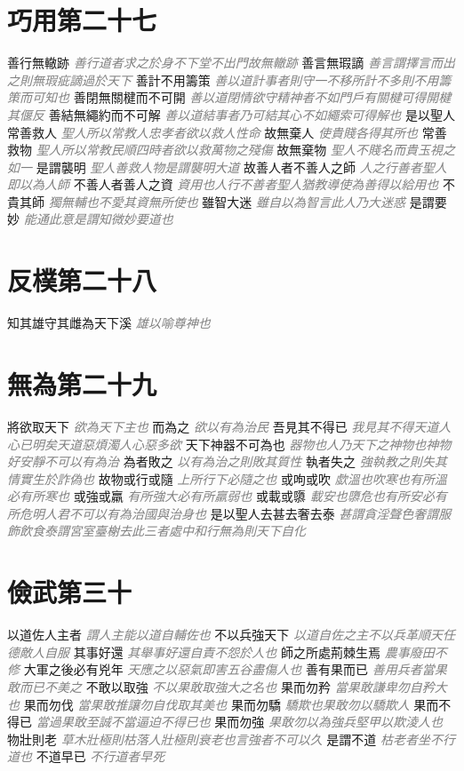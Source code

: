 \documentclass[a4paper,zihao=-4,oneside,landscape,UTF8]{ctexart}
\newcommand{\zhushi}[1]{\scriptsize{\textit{\textcolor{gray}{#1}}}\normalsize}
\begin{document}
\section{巧用第二十七}

善行無轍跡
\zhushi{善行道者求之於身不下堂不出門故無轍跡}
善言無瑕謫
\zhushi{善言謂擇言而出之則無瑕疵謫過於天下}
善計不用籌策
\zhushi{善以道計事者則守一不移所計不多則不用籌策而可知也}
善閉無關楗而不可開
\zhushi{善以道閉情欲守精神者不如門戶有關楗可得開楗其偃反}
善結無繩約而不可解
\zhushi{善以道結事者乃可結其心不如繩索可得解也}
是以聖人常善救人
\zhushi{聖人所以常教人忠孝者欲以救人性命}
故無棄人
\zhushi{使貴賤各得其所也}
常善救物
\zhushi{聖人所以常教民順四時者欲以救萬物之殘傷}
故無棄物
\zhushi{聖人不賤名而貴玉視之如一}
是謂襲明
\zhushi{聖人善救人物是謂襲明大道}
故善人者不善人之師
\zhushi{人之行善者聖人即以為人師}
不善人者善人之資
\zhushi{資用也人行不善者聖人猶教導使為善得以給用也}
不貴其師
\zhushi{獨無輔也不愛其資無所使也}
雖智大迷
\zhushi{雖自以為智言此人乃大迷惑}
是謂要妙
\zhushi{能通此意是謂知微妙要道也}


\section{反樸第二十八}

知其雄守其雌為天下溪
\zhushi{雄以喻尊神也}


\section{無為第二十九}

將欲取天下
\zhushi{欲為天下主也}
而為之
\zhushi{欲以有為治民}
吾見其不得已
\zhushi{我見其不得天道人心已明矣天道惡煩濁人心惡多欲}
天下神器不可為也
\zhushi{器物也人乃天下之神物也神物好安靜不可以有為治}
為者敗之
\zhushi{以有為治之則敗其質性}
執者失之
\zhushi{強執教之則失其情實生於詐偽也}
故物或行或隨
\zhushi{上所行下必隨之也}
或呴或吹
\zhushi{歔溫也吹寒也有所溫必有所寒也}
或強或羸
\zhushi{有所強大必有所羸弱也}
或載或隳
\zhushi{載安也隳危也有所安必有所危明人君不可以有為治國與治身也}
是以聖人去甚去奢去泰
\zhushi{甚謂貪淫聲色奢謂服飾飲食泰謂宮室臺榭去此三者處中和行無為則天下自化}


\section{儉武第三十}

以道佐人主者
\zhushi{謂人主能以道自輔佐也}
不以兵強天下
\zhushi{以道自佐之主不以兵革順天任德敵人自服}
其事好還
\zhushi{其舉事好還自責不怨於人也}
師之所處荊棘生焉
\zhushi{農事廢田不修}
大軍之後必有兇年
\zhushi{天應之以惡氣即害五谷盡傷人也}
善有果而已
\zhushi{善用兵者當果敢而已不美之}
不敢以取強
\zhushi{不以果敢取強大之名也}
果而勿矜
\zhushi{當果敢謙卑勿自矜大也}
果而勿伐
\zhushi{當果敢推讓勿自伐取其美也}
果而勿驕
\zhushi{驕欺也果敢勿以驕欺人}
果而不得已
\zhushi{當過果敢至誠不當逼迫不得已也}
果而勿強
\zhushi{果敢勿以為強兵堅甲以欺淩人也}
物壯則老
\zhushi{草木壯極則枯落人壯極則衰老也言強者不可以久}
是謂不道
\zhushi{枯老者坐不行道也}
不道早已
\zhushi{不行道者早死}
\end{document}

